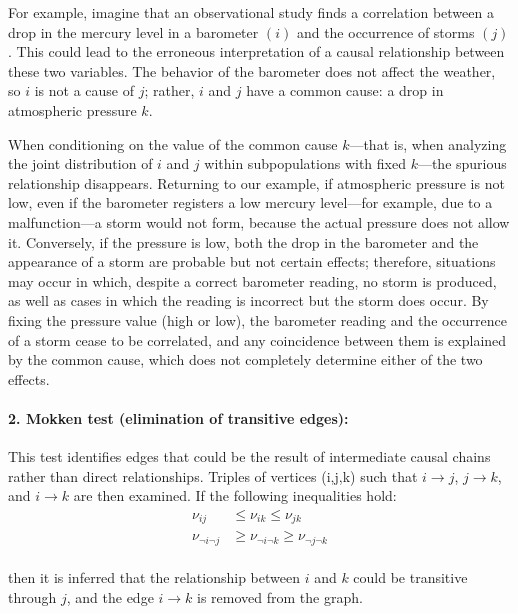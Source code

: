 \documentclass[12pt,a4paper]{report}
\begin{document}
For example, imagine that an observational study finds a correlation between a drop in the mercury level in a barometer $(i)$ and the occurrence of storms $(j)$. This could lead to the erroneous interpretation of a causal relationship between these two variables. The behavior of the barometer does not affect the weather, so $i$ is not a cause of $j$; rather, $i$ and $j$ have a common cause: a drop in atmospheric pressure $k$.

When conditioning on the value of the common cause $k$---that is, when analyzing the joint distribution of $i$ and $j$ within subpopulations with fixed $k$---the spurious relationship disappears. Returning to our example, if atmospheric pressure is not low, even if the barometer registers a low mercury level---for example, due to a malfunction---a storm would not form, because the actual pressure does not allow it. Conversely, if the pressure is low, both the drop in the barometer and the appearance of a storm are probable but not certain effects; therefore, situations may occur in which, despite a correct barometer reading, no storm is produced, as well as cases in which the reading is incorrect but the storm does occur. By fixing the pressure value (high or low), the barometer reading and the occurrence of a storm cease to be correlated, and any coincidence between them is explained by the common cause, which does not completely determine either of the two effects.

\paragraph{2. Mokken test (elimination of transitive edges):}
This test identifies edges that could be the result of intermediate causal chains rather than direct relationships. Triples of vertices (i,j,k) such that $i \to j$, $j \to k$, and $i \to k$ are then examined. If the following inequalities hold\cite{mokken}:
\begin{align}
\label{eq:mokk1}
\nu_{ij} &\leq \nu_{ik} \leq \nu_{jk}  \\
\label{eq:mokk2}
\nu_{\neg i \neg j} &\geq \nu_{\neg i \neg k} \geq \nu_{\neg j \neg k}
\end{align}
\\
then it is inferred that the relationship between \( i \) and \( k \) could be transitive through \( j \), and the edge \( i \to k \) is removed from the graph\cite{parametric}. 
\end{document}
